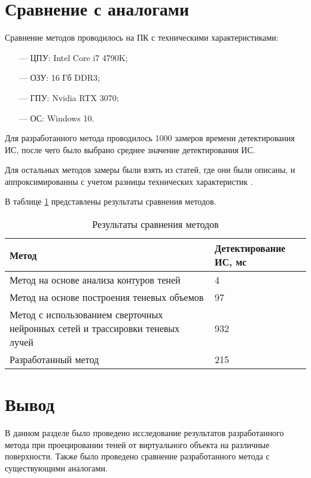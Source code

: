 \section{Сравнение с аналогами}

Сравнение методов проводилось на ПК с техническими характеристиками:

\begin{itemize}
	\item[---] ЦПУ: Intel Core i7 4790K;
	\item[---] ОЗУ: 16 Гб DDR3;
	\item[---] ГПУ: Nvidia RTX 3070;
	\item[---] ОС: Windows 10.
\end{itemize}

Для разработанного метода проводилось 1000 замеров времени детектирования ИС, после чего было выбрано среднее значение детектирования ИС.

Для остальных методов замеры были взять из статей, где они были описаны, и аппроксимированны с учетом разницы технических характеристик \cite{shadow_contours_method} \cite{THOMASIAN2022385} \cite{sns_tras}.

В таблице \ref{CompareMethods} представлены результаты сравнения методов.

\begin{table}[H]
	\caption{Результаты сравнения методов}
	\label{CompareMethods}
	\begin{center}
		\begin{tabular}{| p{8 cm} | p{3.5 cm} |} 
			\hline
			Метод & Детектирование ИС, мс \\
			\hline
			Метод на основе анализа контуров теней & 4 \\
			\hline
			Метод на основе построения теневых объемов & 97 \\
			\hline
			Метод с использованием сверточных нейронных сетей и трассировки теневых лучей & 932 \\
			\hline
			Разработанный метод & 215 \\
			\hline
		\end{tabular}
	\end{center}
\end{table}

\section{Вывод}

В данном разделе было проведено исследование результатов разработанного метода при проецировании теней от виртуального объекта на различные поверхности. Также было проведено сравнение разработанного метода с существующими аналогами.

